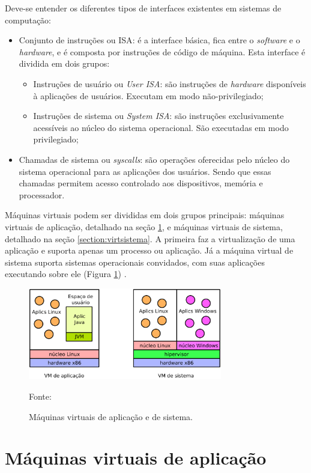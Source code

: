 Deve-se entender os diferentes tipos de interfaces existentes em sistemas de computação:
\begin{itemize}
 \item Conjunto de instruções ou \ac{ISA}: é a interface básica, fica entre o \textit{software} e o \textit{hardware}, e é composta por 
 instruções de código de máquina. Esta interface é dividida em dois grupos:
 \begin{itemize}
  \item Instruções de usuário ou \textit{User \ac{ISA}}: são instruções de \textit{hardware} disponíveis à aplicações de usuários. Executam
  em modo não-privilegiado;
  \item Instruções de sistema ou \textit{System \ac{ISA}}: são instruções exclusivamente acessíveis ao núcleo do sistema operacional. 
  São executadas em modo privilegiado;
 \end{itemize}
 \item Chamadas de sistema ou \textit{syscalls}: são operações oferecidas pelo núcleo do sistema operacional para as aplicações dos usuários.
 Sendo que essas chamadas permitem acesso controlado aos dispositivos, memória e processador.
\end{itemize}

Máquinas virtuais podem ser divididas em dois grupos principais: máquinas virtuais de aplicação, detalhado na seção 
\ref{section:virtaplicacao}, e máquinas virtuais de sistema, detalhado na seção \ref{section:virtsistema}. A primeira faz a virtualização 
de uma aplicação e suporta apenas um processo ou aplicação. Já a máquina virtual de sistema suporta sistemas operacionais convidados, com 
suas aplicações executando sobre ele (Figura \ref{fig:vms_tipos}) \cite{laureano2008}.

\begin{figure}[vms_tipos]
 \centering
 \includegraphics[width=320px]{img/vms_tipos.eps}
 \caption{Máquinas virtuais de aplicação e de sistema.}
 \label{fig:vms_tipos}
 Fonte: \citet{laureano2008}
\end{figure}

\section{Máquinas virtuais de aplicação}
\label{section:virtaplicacao}

